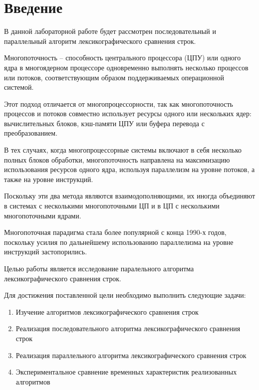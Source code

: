 \chapter*{Введение}

    В данной лабораторной работе будет рассмотрен последовательный и параллельный алгоритм лексикографического сравнения строк.

    Многопоточность – способность центрального процессора (ЦПУ) или одного ядра в многоядерном процессоре одновременно выполнять несколько процессов или потоков, соответствующим образом поддерживаемых операционной системой. 

    Этот подход отличается от многопроцессорности, так как многопоточность процессов и потоков совместно использует ресурсы одного или нескольких ядер: вычислительных блоков, кэш-памяти ЦПУ или буфера перевода с преобразованием.

    В тех случаях, когда многопроцессорные системы включают в себя несколько полных блоков обработки, многопоточность направлена на максимизацию использования ресурсов одного ядра, используя параллелизм на уровне потоков, а также на уровне инструкций.

    Поскольку эти два метода являются взаимодополняющими, их иногда объединяют в системах с несколькими многопоточными ЦП и в ЦП с несколькими многопоточными ядрами.

    Многопоточная парадигма стала более популярной с конца 1990-х годов, поскольку усилия по дальнейшему использованию параллелизма на уровне инструкций застопорились.

    Целью работы является исследование паралельного алгоритма лексикографического сравнения строк.

    Для достижения поставленной цели необходимо выполнить следующие задачи:

    \begin{enumerate}
        \item Изучение алгоритмов лексикографического сравнения строк
        \item Реализация последовательного алгоритма лексикографического сравнения строк
        \item Реализация параллельного алгоритма лексикографического сравнения строк
        \item Экспериментальное сравнение временных характеристик реализованных алгоритмов
    \end{enumerate}
